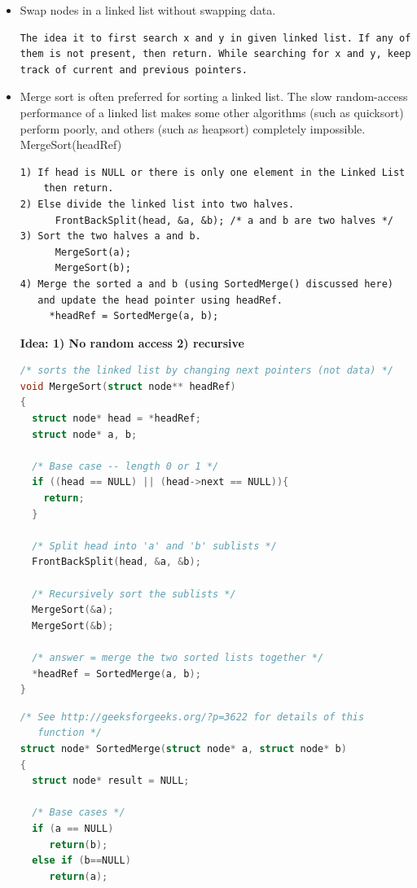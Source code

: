 \documentclass[a4paper,11pt,twoside]{book}
\begin{document}
\begin{itemize}
\item Swap nodes in a linked list without swapping data. 
\begin{lstlisting}[breaklines]
The idea it to first search x and y in given linked list. If any of them is not present, then return. While searching for x and y, keep track of current and previous pointers.
\end{lstlisting}


\item Merge sort is often preferred for sorting a linked list. The slow random-access performance of a linked list makes some other algorithms (such as quicksort) perform poorly, and others (such as heapsort) completely impossible. MergeSort(headRef)
\begin{verbatim}
1) If head is NULL or there is only one element in the Linked List 
    then return.
2) Else divide the linked list into two halves.  
      FrontBackSplit(head, &a, &b); /* a and b are two halves */
3) Sort the two halves a and b.
      MergeSort(a);
      MergeSort(b);
4) Merge the sorted a and b (using SortedMerge() discussed here) 
   and update the head pointer using headRef.
     *headRef = SortedMerge(a, b);
\end{verbatim}
\textbf{Idea: 1) No random access 2) recursive}

\begin{lstlisting}[frame=single, language=c++] 
/* sorts the linked list by changing next pointers (not data) */
void MergeSort(struct node** headRef)
{
  struct node* head = *headRef;
  struct node* a, b;
 
  /* Base case -- length 0 or 1 */
  if ((head == NULL) || (head->next == NULL)){
    return;
  }

  /* Split head into 'a' and 'b' sublists */
  FrontBackSplit(head, &a, &b); 
 
  /* Recursively sort the sublists */
  MergeSort(&a);
  MergeSort(&b);
 
  /* answer = merge the two sorted lists together */
  *headRef = SortedMerge(a, b);
}

\end{lstlisting}

 \begin{lstlisting}[frame=single, language=c++] 
/* See http://geeksforgeeks.org/?p=3622 for details of this 
   function */
struct node* SortedMerge(struct node* a, struct node* b)
{
  struct node* result = NULL;
 
  /* Base cases */
  if (a == NULL)
     return(b);
  else if (b==NULL)
     return(a);
 

\end{lstlisting}
\end{itemize}
\end{document}
